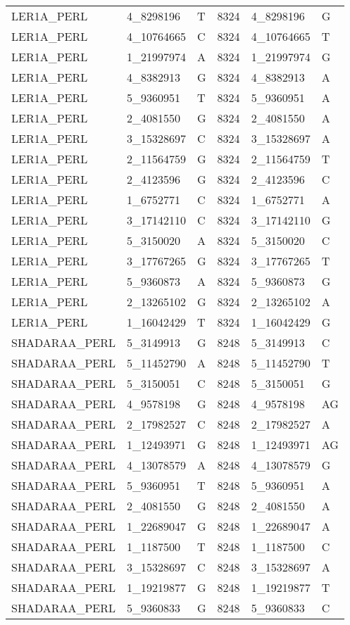 \begin{center}
\begin{longtable}{|l|l|l|l|l|l|}
LER1A\_PERL&4\_8298196&T&8324&4\_8298196&G\\
LER1A\_PERL&4\_10764665&C&8324&4\_10764665&T\\
LER1A\_PERL&1\_21997974&A&8324&1\_21997974&G\\
LER1A\_PERL&4\_8382913&G&8324&4\_8382913&A\\
LER1A\_PERL&5\_9360951&T&8324&5\_9360951&A\\
LER1A\_PERL&2\_4081550&G&8324&2\_4081550&A\\
LER1A\_PERL&3\_15328697&C&8324&3\_15328697&A\\
LER1A\_PERL&2\_11564759&G&8324&2\_11564759&T\\
LER1A\_PERL&2\_4123596&G&8324&2\_4123596&C\\
LER1A\_PERL&1\_6752771&C&8324&1\_6752771&A\\
LER1A\_PERL&3\_17142110&C&8324&3\_17142110&G\\
LER1A\_PERL&5\_3150020&A&8324&5\_3150020&C\\
LER1A\_PERL&3\_17767265&G&8324&3\_17767265&T\\
LER1A\_PERL&5\_9360873&A&8324&5\_9360873&G\\
LER1A\_PERL&2\_13265102&G&8324&2\_13265102&A\\
LER1A\_PERL&1\_16042429&T&8324&1\_16042429&G\\
SHADARAA\_PERL&5\_3149913&G&8248&5\_3149913&C\\
SHADARAA\_PERL&5\_11452790&A&8248&5\_11452790&T\\
SHADARAA\_PERL&5\_3150051&C&8248&5\_3150051&G\\
SHADARAA\_PERL&4\_9578198&G&8248&4\_9578198&AG\\
SHADARAA\_PERL&2\_17982527&C&8248&2\_17982527&A\\
SHADARAA\_PERL&1\_12493971&G&8248&1\_12493971&AG\\
SHADARAA\_PERL&4\_13078579&A&8248&4\_13078579&G\\
SHADARAA\_PERL&5\_9360951&T&8248&5\_9360951&A\\
SHADARAA\_PERL&2\_4081550&G&8248&2\_4081550&A\\
SHADARAA\_PERL&1\_22689047&G&8248&1\_22689047&A\\
SHADARAA\_PERL&1\_1187500&T&8248&1\_1187500&C\\
SHADARAA\_PERL&3\_15328697&C&8248&3\_15328697&A\\
SHADARAA\_PERL&1\_19219877&G&8248&1\_19219877&T\\
SHADARAA\_PERL&5\_9360833&G&8248&5\_9360833&C\\

\end{longtable}
\end{center}
